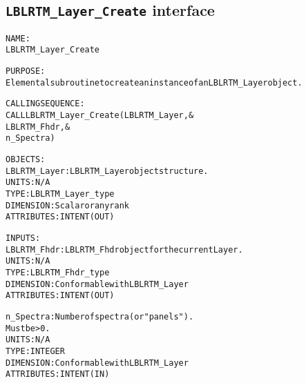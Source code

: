 \subsection{\texttt{LBLRTM\_Layer\_Create} interface}
  \label{sec:LBLRTM_Layer_Create_interface}
  \begin{alltt}
 
  NAME:
        LBLRTM_Layer_Create
 
  PURPOSE:
        Elemental subroutine to create an instance of an LBLRTM_Layer object.
 
  CALLING SEQUENCE:
        CALL LBLRTM_Layer_Create( LBLRTM_Layer, &
                                  LBLRTM_Fhdr , &
                                  n_Spectra     )
 
  OBJECTS:
        LBLRTM_Layer:       LBLRTM_Layer object structure.
                            UNITS:      N/A
                            TYPE:       LBLRTM_Layer_type
                            DIMENSION:  Scalar or any rank
                            ATTRIBUTES: INTENT(OUT)
 
  INPUTS:
        LBLRTM_Fhdr:        LBLRTM_Fhdr object for the current Layer.
                            UNITS:      N/A
                            TYPE:       LBLRTM_Fhdr_type
                            DIMENSION:  Conformable with LBLRTM_Layer
                            ATTRIBUTES: INTENT(OUT)
 
        n_Spectra:          Number of spectra (or "panels").
                            Must be > 0.
                            UNITS:      N/A
                            TYPE:       INTEGER
                            DIMENSION:  Conformable with LBLRTM_Layer
                            ATTRIBUTES: INTENT(IN)
 
  \end{alltt}
